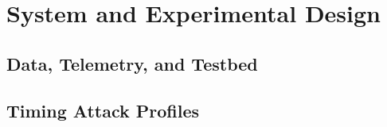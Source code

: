 \documentclass{vgtc}                          %
\begin{document}



\section{System and Experimental Design}

\subsection{Data, Telemetry, and Testbed}


\subsection{Timing Attack Profiles}


\end{document}
